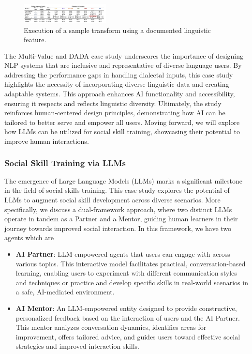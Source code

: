 \documentclass[
  letterpaper,
  DIV=11,
  numbers=noendperiod,
  oneside]{scrreprt}
\theoremstyle{remark}
\begin{document}
\begin{figure}

{\centering \includegraphics[width=0.4\textwidth,height=\textheight]{Figures/MV4.png}

}

\caption{Execution of a sample transform using a documented linguistic
feature.}

\end{figure}%

The Multi-Value and DADA case study underscores the importance of
designing NLP systems that are inclusive and representative of diverse
language users. By addressing the performance gaps in handling dialectal
inputs, this case study highlights the necessity of incorporating
diverse linguistic data and creating adaptable systems. This approach
enhances AI functionality and accessibility, ensuring it respects and
reflects linguistic diversity. Ultimately, the study reinforces
human-centered design principles, demonstrating how AI can be tailored
to better serve and empower all users. Moving forward, we will explore
how LLMs can be utilized for social skill training, showcasing their
potential to improve human interactions.

\subsubsection{Social Skill Training via
LLMs}\label{social-skill-training-via-llms}

The emergence of Large Language Models (LLMs) marks a significant
milestone in the field of social skills training. This case study
explores the potential of LLMs to augment social skill development
across diverse scenarios. More specifically, we discuss a dual-framework
approach, where two distinct LLMs operate in tandem as a Partner and a
Mentor, guiding human learners in their journey towards improved social
interaction. In this framework, we have two agents which are

\begin{itemize}
\item
  \textbf{AI Partner}: LLM-empowered agents that users can engage with
  across various topics. This interactive model facilitates practical,
  conversation-based learning, enabling users to experiment with
  different communication styles and techniques or practice and develop
  specific skills in real-world scenarios in a safe, AI-mediated
  environment.
\item
  \textbf{AI Mentor}: An LLM-empowered entity designed to provide
  constructive, personalized feedback based on the interaction of users
  and the AI Partner. This mentor analyzes conversation dynamics,
  identifies areas for improvement, offers tailored advice, and guides
  users toward effective social strategies and improved interaction
  skills.
\end{itemize}
\end{document}
